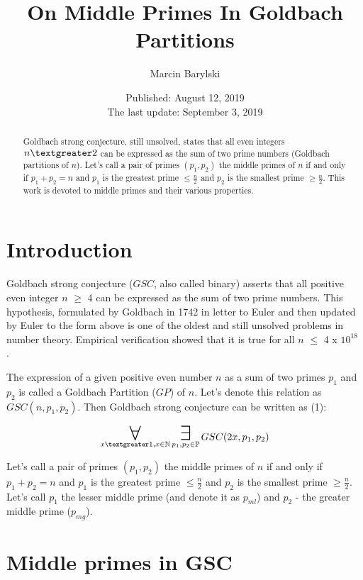 \documentclass[10pt,twocolumn]{article}
\title{On Middle Primes In Goldbach Partitions}
\author{Marcin Barylski}
\date{\small{Published: August 12, 2019 \\ The last update: September 3, 2019}}
\newcommand\bigforall{\mbox{\huge $\mathsurround0pt\forall$}}
\newcommand\bigexists{\mbox{\huge $\mathsurround0pt\exists$}}
\begin{document}
\maketitle

\begin{abstract}
Goldbach strong conjecture, still unsolved, states that all even integers $n \textgreater 2$ can be expressed as the sum of two prime numbers (Goldbach partitions of $n$). Let's call a pair of primes $(p_1, p_2)$ the middle primes of $n$ if and only if $p_1 + p_2 = n$ and $p_1$ is the greatest prime $\leq \frac{n}{2}$ and  $p_2$ is the smallest prime $\geq \frac{n}{2}$. This work is devoted to middle primes and their various properties.
\end{abstract}

\section{Introduction}

Goldbach strong conjecture ($GSC$, also called binary) asserts that all positive even integer $n$ $\geq$ 4 can be expressed as the sum of two prime numbers. This hypothesis, formulated by Goldbach in 1742 in letter to Euler \cite{goldbach1742} and then updated by Euler to the form above is one of the oldest and still unsolved problems in number theory. Empirical verification showed that it is true for all $n$ $\leq$ 4 x $10^{18}$ \cite{oliveira2012} \cite{oliveira2013}.\par
The expression of a given positive even number $n$ as a sum of two primes $p_1$ and $p_2$ is called a Goldbach Partition ($GP$) of $n$.  Let's denote this relation as $GSC(n, p_1, p_2)$. Then Goldbach strong conjecture can be written as (1):

\begin{equation}
\displaystyle\mathop{\bigforall}_{x \textgreater 1, x \in \mathbb{N}} \displaystyle\mathop{\bigexists}_{p_1, p_2 \in \mathbb{P}} GSC (2x, p_1, p_2)
\end{equation}

Let's call a pair of primes $(p_1, p_2)$ the middle primes of $n$ if and only if $p_1 + p_2 = n$ and $p_1$ is the greatest prime $\leq \frac{n}{2}$ and  $p_2$ is the smallest prime $\geq \frac{n}{2}$. Let's call $p_1$ the lesser middle prime (and denote it as $p_{ml}$) and $p_2$ - the greater middle prime ($p_{mg}$).

\section{Middle  primes in GSC}
\end{document}
